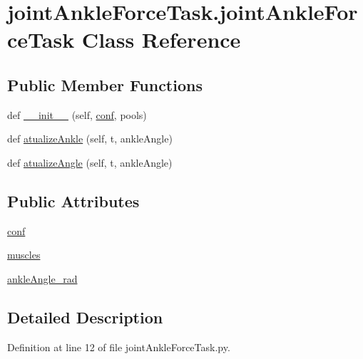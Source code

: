 \hypertarget{classjoint_ankle_force_task_1_1joint_ankle_force_task}{}\section{joint\+Ankle\+Force\+Task.\+joint\+Ankle\+Force\+Task Class Reference}
\label{classjoint_ankle_force_task_1_1joint_ankle_force_task}
\subsection*{Public Member Functions}
\begin{DoxyCompactItemize}
\item 
def \hyperlink{classjoint_ankle_force_task_1_1joint_ankle_force_task_ac7953dac49e9ab0e2a2101d5d100bc56}{\+\_\+\+\_\+init\+\_\+\+\_\+} (self, \hyperlink{classjoint_ankle_force_task_1_1joint_ankle_force_task_a5119490fc4e491dad4695eb8e73e8071}{conf}, pools)
\item 
def \hyperlink{classjoint_ankle_force_task_1_1joint_ankle_force_task_ac56f1fed7d1cc67d92d1ed7ab01c11c8}{atualize\+Ankle} (self, t, ankle\+Angle)
\item 
def \hyperlink{classjoint_ankle_force_task_1_1joint_ankle_force_task_ad8da9793d058668f39e7c3516f2dc7cb}{atualize\+Angle} (self, t, ankle\+Angle)
\end{DoxyCompactItemize}
\subsection*{Public Attributes}
\begin{DoxyCompactItemize}
\item 
\hyperlink{classjoint_ankle_force_task_1_1joint_ankle_force_task_a5119490fc4e491dad4695eb8e73e8071}{conf}
\item 
\hyperlink{classjoint_ankle_force_task_1_1joint_ankle_force_task_a4f6481ccda853f0660ffb08cda3e31c1}{muscles}
\item 
\hyperlink{classjoint_ankle_force_task_1_1joint_ankle_force_task_a573211a402cbd6424a80f53983fb5b89}{ankle\+Angle\+\_\+rad}
\end{DoxyCompactItemize}


\subsection{Detailed Description}


Definition at line 12 of file joint\+Ankle\+Force\+Task.\+py.



